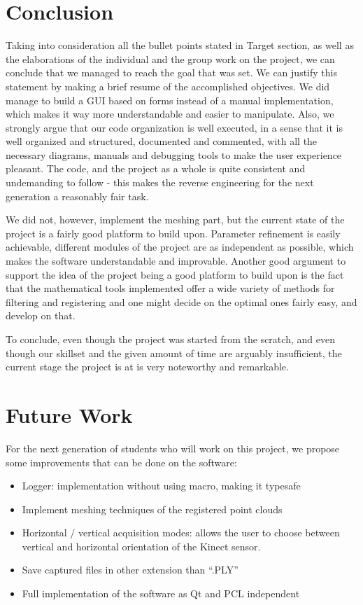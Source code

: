 \documentclass[aps,letterpaper,11pt]{revtex4}
\begin{document}
\section{Conclusion}
Taking into consideration all the bullet points stated in Target section, as well as the elaborations of the individual and the group work on the project, we can conclude that we managed to reach the goal that was set. We can justify this statement by making a brief resume of the accomplished objectives. We did manage to build a GUI based on forms instead of a manual implementation, which makes it way more understandable and easier to manipulate. Also, we strongly argue that our code organization is well executed, in a sense that it is well organized and structured, documented and commented, with all the necessary diagrams, manuals and debugging tools to make the user experience pleasant. The code, and the project as a whole is quite consistent and undemanding to follow - this makes the reverse engineering for the next generation a reasonably fair task.\par
We did not, however, implement the meshing part, but the current state of the project is a fairly good platform to build upon. Parameter refinement is easily achievable, different modules of the project are as independent as possible, which makes the software understandable and improvable. Another good argument to support the idea of the project being a good platform to build upon is the fact that the mathematical tools implemented offer a wide variety of methods for filtering and registering and one might decide on the optimal ones fairly easy, and develop on that. \par
To conclude, even though the project was started from the scratch, and even though our skillset and the given amount of time are arguably insufficient, the current stage the project is at is very noteworthy and remarkable. 
\pagebreak

\section{Future Work}
For the next generation of students who will work on this project, we propose some improvements that can be done on the software:\par
\begin{itemize}
\item Logger: implementation without using macro, making it typesafe
\item Implement meshing techniques of the registered point clouds
\item Horizontal / vertical acquisition modes: allows the user to choose between vertical and horizontal orientation of the Kinect sensor.
\item Save captured files in other extension than “.PLY”
\item Full implementation of the software as Qt and PCL independent
\end{itemize}
\end{document}
